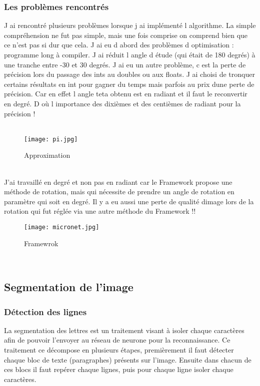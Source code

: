 \documentclass{article}
\begin{document}
                          \subsubsection {Les problèmes rencontrés}
J ai rencontré plusieurs problèmes lorsque j ai implémenté l algorithme. La simple compréhension ne fut pas simple, mais une fois comprise on comprend bien que ce n'est pas si dur que cela. J ai eu d abord des problèmes d optimisation : programme long à compiler. J ai réduit l angle d étude (qui était de 180 degrés) à une tranche entre -30 et 30 degrés. J ai eu un autre problème, c est la perte de précision lors du passage des ints au doubles ou aux floats. J ai choisi de tronquer certains résultats en int pour gagner du temps mais parfois au prix dune perte de précision. Car en effet l angle teta obtenu est en radiant et il faut le reconvertir en degré. D où l importance des dixièmes et des centièmes de radiant pour la précision !\\
\\
    \begin{figure}[hp]
	    \centering
	    \texttt{[image: pi.jpg]}
	    \caption{Approximation}
    \end{figure}
\\
J'ai travaillé en degré et non pas en radiant car le Framework propose une méthode de rotation, mais qui nécessite de prendre un angle de rotation en paramètre qui soit en degré. Il y a eu aussi une perte de qualité dimage lors de la rotation qui fut réglée via une autre méthode du Framework !!\\
\newpage
    \begin{figure}[hp]
	    \centering
	    \texttt{[image: micronet.jpg]}
	    \caption{Framewrok}
    \end{figure}
\\
              \subsection{Segmentation de l'image }
                          \subsubsection {Détection des lignes}
La segmentation des lettres est un traitement visant à isoler chaque caractères afin de pouvoir l’envoyer au réseau de neurone pour la reconnaissance. Ce traitement ce décompose en plusieurs étapes, premièrement il faut détecter chaque bloc de texte (paragraphes) présents sur l’image. Ensuite dans chacun de ces blocs il faut repérer chaque lignes, puis pour chaque ligne isoler chaque caractères.\\
\end{document}
